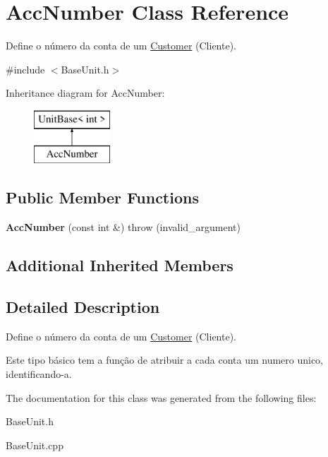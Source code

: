 \hypertarget{classAccNumber}{\section{Acc\-Number Class Reference}
\label{classAccNumber}
}


Define o número da conta de um \hyperlink{classCustomer}{Customer} (Cliente).  




{\ttfamily \#include $<$Base\-Unit.\-h$>$}

Inheritance diagram for Acc\-Number\-:\begin{figure}[H]
\begin{center}
\leavevmode
\includegraphics[height=2.000000cm]{classAccNumber}
\end{center}
\end{figure}
\subsection*{Public Member Functions}
\begin{DoxyCompactItemize}
\item 
\hypertarget{classAccNumber_adf37dc081ad18a2a6968d9d0b9f92002}{{\bfseries Acc\-Number} (const int \&)  throw (invalid\-\_\-argument)}\label{classAccNumber_adf37dc081ad18a2a6968d9d0b9f92002}

\end{DoxyCompactItemize}
\subsection*{Additional Inherited Members}


\subsection{Detailed Description}
Define o número da conta de um \hyperlink{classCustomer}{Customer} (Cliente). 

Este tipo básico tem a função de atribuir a cada conta um numero unico, identificando-\/a. 

The documentation for this class was generated from the following files\-:\begin{DoxyCompactItemize}
\item 
Base\-Unit.\-h\item 
Base\-Unit.\-cpp\end{DoxyCompactItemize}
